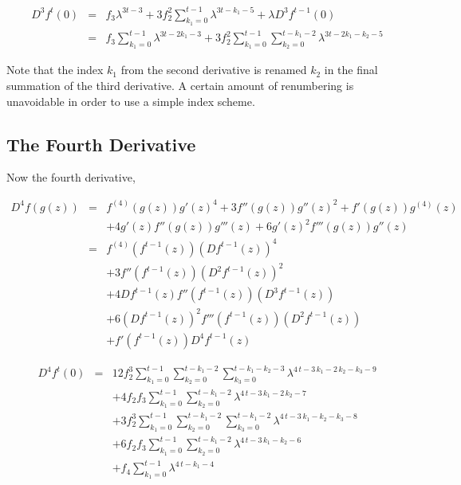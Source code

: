 \documentclass{article}
\theoremstyle{definition}
\begin{document}
\begin{eqnarray}
 D^3f^t(0)&=&f_3\lambda^{3t-3}+3 f_2^2\sum_{k_1=0}^{t-1}\lambda^{3t-k_1-5}
               +\lambda D^3f^{t-1}(0) \nonumber\\
            &=&f_3\sum_{k_1=0}^{t-1}\lambda^{3t-2k_1-3}
               +3f_2^2 \sum_{k_1=0}^{t-1}
                       \sum_{k_2=0}^{t-k_1-2}
                          \lambda^{3t-2k_1-k_2-5}  
 \label{eq:TheThirdDerivative}                                                                         
\end{eqnarray}

Note that the index $k_1$ from the second derivative is renamed $k_2$ in the final summation of the third derivative. A certain amount of renumbering is unavoidable in order to use a simple index scheme. 


\subsection{The Fourth Derivative}
\label{sec:TheFourthDerivative}

Now the fourth derivative,

\begin{eqnarray}
	D^4f(g(z))&=& f^{(4)}(g(z))g'(z)^4 +3f''(g(z))g''(z)^2 +f'(g(z))g^{(4)}(z)  \nonumber\\
	          & & + 4g'(z) f''(g(z))g'''(z) + 6g'(z)^2 f'''(g(z))g''(z)  \nonumber\\
	          &=& f^{(4)}(f^{t-1}(z))(Df^{t-1}(z))^4  \nonumber\\
	          & & +3f''(f^{t-1}(z))(D^2 f^{t-1}(z))^2   \nonumber\\
	          & & +4Df^{t-1}(z) f''(f^{t-1}(z))(D^3 f^{t-1}(z))  \nonumber\\
	          & & +6(Df^{t-1}(z))^2 f'''(f^{t-1}(z))(D^2f^{t-1}(z)) \nonumber\\
	          & & +f'(f^{t-1}(z))D^{4} f^{t-1}(z)    \nonumber		                      
\end{eqnarray}


\begin{eqnarray}
 D^4f^t(0)&=&12 f_2^3 
   \sum_{{k_1} = 0}^{t-1} 
   \sum_{{k_2} = 0}^{t - {k_1}-2}
   \sum_{{k_3} = 0}^{t - {k_1} - {k_2}-3}
     {{\lambda}}^{4\,t - 3\,{k_1} - 2\,{k_2}- {k_3} -9} \\     
          & &+4 {f_2} {f_3} 
   \sum_{{k_1} = 0}^{t-1} 
   \sum_{{k_2} = 0}^{t - {k_1}-2}
     {{\lambda}}^{4\,t - 3\,{k_1} - 2\,{k_2} -7}\nonumber \\
          & &+3 f_2^3
     \sum_{{k_1} = 0}^{t-1} 
     \sum_{{k_2}= 0}^{t - {k_1} -2}
     \sum_{{k_3} = 0}^{t - {k_1} -2}
     {{\lambda}}^{4\,t - 3\,{k_1} - {k_2} - {k_3} -8} 	\nonumber \\
          & &+6 {f_2} {f_3}
     \sum_{{k_1} = 0}^{t-1} 
     \sum_{{k_2} = 0}^{t - {k_1} -2}
     {{\lambda}}^{4\,t - 3\,{k_1} - {k_2} -6}  \nonumber \\
          & &+{f_4}
     \sum_{{k_1} = 0}^{t-1} 
     {{\lambda}}^{4\,t - {k_1} -4}  \nonumber
 \label{eq:TheFourthDerivative}      
\end{eqnarray}
\end{document}
